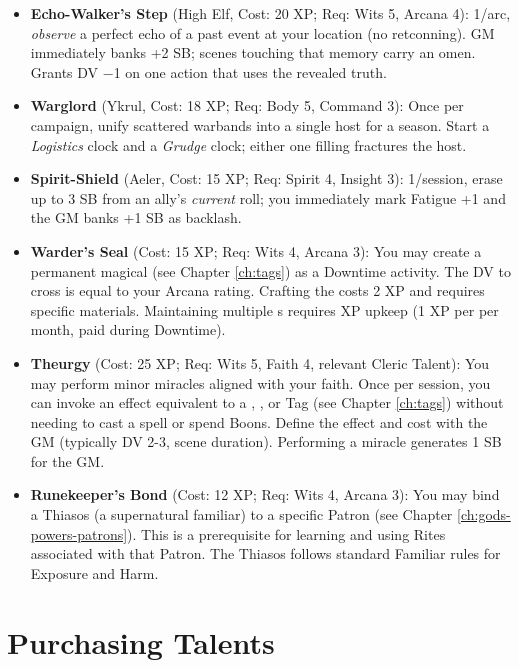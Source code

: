 \begin{itemize}
    \item \textbf{Echo-Walker's Step} (High Elf, Cost: 20 XP; Req: Wits 5, Arcana 4): 
1/arc, \emph{observe} a perfect echo of a past event at your location (no retconning). 
GM immediately banks +2 SB; scenes touching that memory carry an omen. Grants DV −1 on one action that uses the revealed truth.
    \item \textbf{Warglord} (Ykrul, Cost: 18 XP; Req: Body 5, Command 3): 
Once per campaign, unify scattered warbands into a single host for a season. Start a \emph{Logistics} clock and a \emph{Grudge} clock; either one filling fractures the host.
    \item \textbf{Spirit-Shield} (Aeler, Cost: 15 XP; Req: Spirit 4, Insight 3): 
1/session, erase up to 3 SB from an ally's \emph{current} roll; you immediately mark Fatigue +1 and the GM banks +1 SB as backlash.
    \item \textbf{Warder's Seal} (Cost: 15 XP; Req: Wits 4, Arcana 3): You may create a permanent magical  (see Chapter \ref{ch:tags}) as a Downtime activity. The DV to cross is equal to your Arcana rating. Crafting the  costs 2 XP and requires specific materials. Maintaining multiple s requires XP upkeep (1 XP per  per month, paid during Downtime).
    \item \textbf{Theurgy} (Cost: 25 XP; Req: Wits 5, Faith 4, relevant Cleric Talent): You may perform minor miracles aligned with your faith. Once per session, you can invoke an effect equivalent to a , , or  Tag (see Chapter \ref{ch:tags}) without needing to cast a spell or spend Boons. Define the effect and cost with the GM (typically DV 2-3, scene duration). Performing a miracle generates 1 SB for the GM.
    \item \textbf{Runekeeper's Bond} (Cost: 12 XP; Req: Wits 4, Arcana 3): You may bind a Thiasos (a supernatural familiar) to a specific Patron (see Chapter \ref{ch:gods-powers-patrons}). This is a prerequisite for learning and using Rites associated with that Patron. The Thiasos follows standard Familiar rules for Exposure and Harm.
\end{itemize}

\section{Purchasing Talents}

